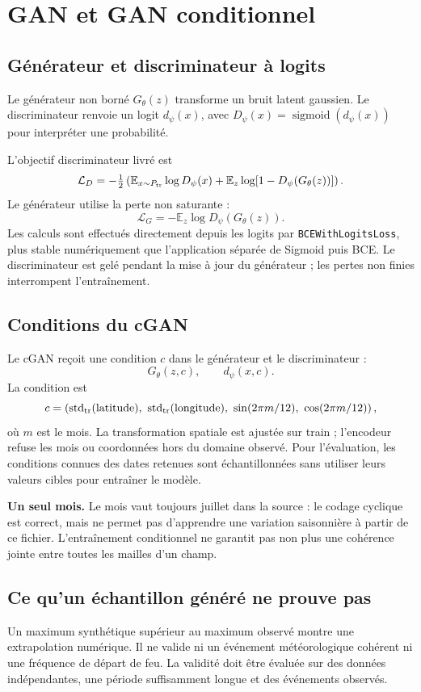 \documentclass[11pt,a4paper]{article}
\newcommand{\E}{\mathbb E}
\begin{document}
\newpage
\section{GAN et GAN conditionnel}
\subsection*{Générateur et discriminateur à logits}
Le générateur non borné $G_\theta(z)$ transforme un bruit latent gaussien. Le discriminateur renvoie un logit $d_\psi(x)$, avec $D_\psi(x)=\operatorname{sigmoid}(d_\psi(x))$ pour interpréter une probabilité.

L'objectif discriminateur livré est
\[
\mathcal L_D=-\tfrac12\left(
\E_{x\sim P_{\rm tr}}\log D_\psi(x)
+\E_z\log[1-D_\psi(G_\theta(z))]\right).
\]
Le générateur utilise la perte non saturante :
\[
\boxed{\mathcal L_G=-\E_z\log D_\psi(G_\theta(z)).}
\]
Les calculs sont effectués directement depuis les logits par \texttt{BCEWithLogitsLoss}, plus stable numériquement que l'application séparée de Sigmoid puis BCE. Le discriminateur est gelé pendant la mise à jour du générateur ; les pertes non finies interrompent l'entraînement.

\subsection*{Conditions du cGAN}
Le cGAN reçoit une condition $c$ dans le générateur et le discriminateur :
\[
G_\theta(z,c),\qquad d_\psi(x,c).
\]
La condition est
\[
c=\left(\operatorname{std}_{\rm tr}(\mathrm{latitude}),\ 
\operatorname{std}_{\rm tr}(\mathrm{longitude}),\
\sin(2\pi m/12),\ \cos(2\pi m/12)\right),
\]
où $m$ est le mois. La transformation spatiale est ajustée sur train ; l'encodeur refuse les mois ou coordonnées hors du domaine observé. Pour l'évaluation, les conditions connues des dates retenues sont échantillonnées sans utiliser leurs valeurs cibles pour entraîner le modèle.

\begin{limitbox}
\textbf{Un seul mois.} Le mois vaut toujours juillet dans la source : le codage cyclique est correct, mais ne permet pas d'apprendre une variation saisonnière à partir de ce fichier. L'entraînement conditionnel ne garantit pas non plus une cohérence jointe entre toutes les mailles d'un champ.
\end{limitbox}

\subsection*{Ce qu'un échantillon généré ne prouve pas}
Un maximum synthétique supérieur au maximum observé montre une extrapolation numérique. Il ne valide ni un événement météorologique cohérent ni une fréquence de départ de feu. La validité doit être évaluée sur des données indépendantes, une période suffisamment longue et des événements observés.
\end{document}
